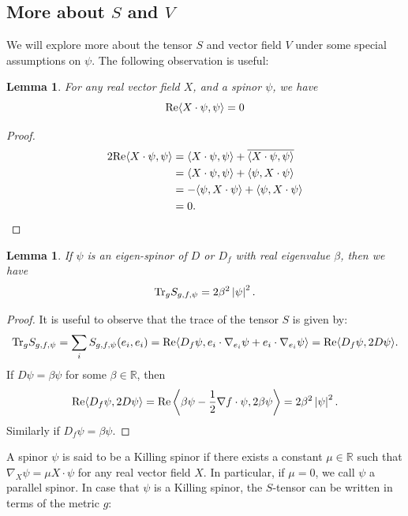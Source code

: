 \documentclass{amsart}
\newtheorem{lemma}[theorem]{Lemma}
\theoremstyle{definition}
\theoremstyle{remark}
\numberwithin{equation}{section}
\newcommand{\abs}[1]{\left|#1\right|}
\newcommand{\Tr}{\textup{Tr}}
\newcommand{\R}{\mathbb{R}}
\begin{document}
\subsection{More about $S$ and $V$}
We will explore more about the tensor $S$ and vector field $V$ under some special assumptions on $\psi$. The following observation is useful:
\begin{lemma}
\label{lma:realVF}
For any real vector field $X$, and a spinor $\psi$, we have
\[\textup{Re}\langle X \cdot \psi, \psi\rangle = 0\]
\end{lemma}
\begin{proof}
\begin{align*}
2\textup{Re} \langle X \cdot \psi, \psi \rangle & = \langle X \cdot \psi, \psi\rangle + \overline{\langle X \cdot \psi, \psi\rangle}\\
& = \langle X \cdot \psi, \psi\rangle + \langle \psi, X \cdot \psi\rangle\\
& = -\langle \psi, X \cdot \psi\rangle + \langle\psi, X \cdot \psi\rangle\\
& = 0.	
\end{align*}
	
\end{proof}






\begin{lemma}
If $\psi$ is an eigen-spinor of $D$ or $D_f$ with real eigenvalue $\beta$, then we have
\[\Tr_g S_{g,f,\psi} = 2\beta^2\abs{\psi}^2.\]	
\end{lemma}
\begin{proof}
It is useful to observe that the trace of the tensor $S$ is given by:
\[\Tr_g S_{g,f,\psi} = \sum_i S_{g,f,\psi}(e_i,e_i) =\textup{Re}\langle D_f\psi, e_i \cdot \nabla_{e_i} \psi + e_i \cdot \nabla_{e_i} \psi\rangle = \textup{Re}\langle D_f\psi,2D\psi\rangle.\]	
If $D\psi = \beta\psi$ for some $\beta \in \R$, then
\[\textup{Re}\langle D_f\psi,2D\psi\rangle = \textup{Re}\left\langle \beta\psi - \frac{1}{2}\nabla f \cdot \psi, 2\beta\psi \right\rangle = 2\beta^2\abs{\psi}^2.\]
Similarly if $D_f\psi = \beta\psi$.

\end{proof}

A spinor $\psi$ is said to be a Killing spinor if there exists a constant $\mu \in \R$ such that $\nabla_X \psi = \mu X \cdot \psi$ for any real vector field $X$. In particular, if $\mu = 0$, we call $\psi$ a parallel spinor. In case that $\psi$ is a Killing spinor, the $S$-tensor can be written in terms of the metric $g$:
\end{document}
